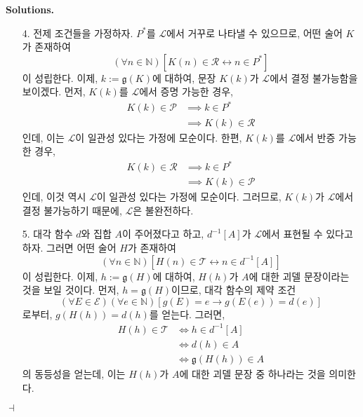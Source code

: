 \documentclass[12pt]{paper}
\newcommand{\gnum}{ \mathfrak{g} }
\newenvironment{context}[1][]{\noindent \textbf{{#1}.}}{\hfill $ \dashv $}
\begin{document}
\begin{context}[Solutions]
\begin{enumerate}
      \item[{4.}] 전제 조건들을 가정하자.
      $P^{*}$를 $\mathcal{L}$에서 거꾸로 나타낼 수 있으므로,
      어떤 술어 $K$가 존재하여 $$ \left( \forall n \in \mathbb{N} \right) \left[ K \left( n \right) \in \mathcal{R} \leftrightarrow n \in P^{*} \right] $$이 성립한다.
      이제, $k := \gnum \left( K \right)$에 대하여, 문장 $K \left( k \right)$가 $\mathcal{L}$에서 결정 불가능함을 보이겠다.
      먼저, $K \left( k \right)$를 $\mathcal{L}$에서 증명 가능한 경우,
      \begin{align*}
        K \left( k \right) \in \mathcal{P}
        & \implies k \in P^{*} \\
        & \implies K \left( k \right) \in \mathcal{R}
      \end{align*}
      인데, 이는 $\mathcal{L}$이 일관성 있다는 가정에 모순이다.
      한편, $K \left( k \right)$를 $\mathcal{L}$에서 반증 가능한 경우,
      \begin{align*}
        K \left( k \right) \in \mathcal{R}
        & \implies k \in P^{*} \\
        & \implies K \left( k \right) \in \mathcal{P}
      \end{align*}
      인데, 이것 역시 $\mathcal{L}$이 일관성 있다는 가정에 모순이다.
      그러므로, $K \left( k \right)$가 $\mathcal{L}$에서 결정 불가능하기 때문에, $\mathcal{L}$은 불완전하다.

      \item[{5.}] 대각 함수 $d$와 집합 $A$이 주어졌다고 하고,
      $d^{-1} \left[ A \right]$가 $\mathcal{L}$에서 표현될 수 있다고 하자.
      그러면 어떤 술어 $H$가 존재하여 $$ \left( \forall n \in \mathbb{N} \right) \left[ H \left( n \right) \in \mathcal{T} \leftrightarrow n \in d^{-1} \left[ A \right] \right]$$이 성립한다.
      이제, $h := \gnum \left( H \right)$에 대하여, $H \left( h \right)$가 $A$에 대한 괴델 문장이라는 것을 보일 것이다.
      먼저, $h = \gnum \left( H \right)$이므로,
      대각 함수의 제약 조건 $$ \left( \forall E \in \mathcal{E} \right) \left( \forall e \in \mathbb{N} \right) \left[ g \left( E \right) = e \rightarrow g \left( E \left( e \right) \right) = d \left( e \right) \right] $$로부터,
      $ g \left( H \left( h \right) \right) = d \left( h \right) $를 얻는다.
      그러면,
      \begin{align*}
        H \left( h \right) \in \mathcal{T}
        & \iff h \in d^{-1} \left[ A \right] \\
        & \iff d \left( h \right) \in A \\
        & \iff \gnum \left( H \left( h \right) \right) \in A
      \end{align*}
      의 동등성을 얻는데,
      이는 $H \left( h \right)$가 $A$에 대한 괴델 문장 중 하나라는 것을 의미한다.
      

\end{enumerate}
\end{context}
\end{document}
